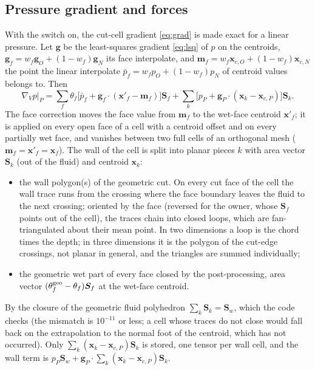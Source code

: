 \documentclass[11pt,a4paper]{article}
\theoremstyle{remark}
\newcommand{\xx}{\bm{x}}
\newcommand{\Sf}{\bm{S}_f}
\newcommand{\Sw}{\bm{S}_w}
\newcommand{\gradV}{\nabla_{\!V}}
\begin{document}
\subsection{Pressure gradient and forces}
\label{sec:grad2}

With the switch on, the cut-cell gradient \eqref{eq:grad} is made exact for a linear pressure.
Let $\bm g$ be the least-squares gradient \eqref{eq:lsq} of $p$ on the centroids, $\bm g_f=
w_f\bm g_O+(1-w_f)\bm g_N$ its face interpolate, and
$\bm m_f=w_f\xx_{c,O}+(1-w_f)\xx_{c,N}$ the point the linear interpolate
$\bar p_f=w_fp_O+(1-w_f)p_N$ of centroid values belongs to. Then
\begin{equation}
\gradV p\big|_P=\sum_f\theta_f\Big[\bar p_f+\bm g_f\cdot(\xx'_f-\bm m_f)\Big]\Sf
+\sum_k\Big[p_P+\bm g_P\cdot(\xx_k-\xx_{c,P})\Big]\bm S_k .
\label{eq:grad2}
\end{equation}
The face correction moves the face value from $\bm m_f$ to the wet-face centroid $\xx'_f$; it is
applied on every open face of a cell with a centroid offset and on every partially wet face, and
vanishes between two full cells of an orthogonal mesh ($\bm m_f=\xx'_f=\xx_f$). The wall of the cell
is split into planar pieces $k$ with area vector $\bm S_k$ (out of the fluid) and centroid
$\xx_k$:
\begin{itemize}\itemsep1pt
\item the wall polygon(s) of the geometric cut. On every cut face of the cell the wall trace runs
      from the crossing where the face boundary leaves the fluid to the next crossing; oriented
      by the face (reversed for the owner, whose $\Sf$ points out of the cell), the traces chain
      into closed loops, which are fan-triangulated about their mean point. In two dimensions a
      loop is the chord times the depth; in three dimensions it is the polygon of the cut-edge
      crossings, not planar in general, and the triangles are summed individually;
\item the geometric wet part of every face closed by the post-processing, area vector
      $(\theta^{\rm geo}_f-\theta_f)\Sf$ at the wet-face centroid.
\end{itemize}
By the closure of the geometric fluid polyhedron $\sum_k\bm S_k=\Sw$, which the code checks
(the mismatch is $10^{-11}$ or less; a cell whose traces do not close would fall back on the
extrapolation to the normal foot of the centroid, which has not occurred). Only
$\sum_k(\xx_k-\xx_{c,P})\bm S_k$ is stored, one tensor per wall cell, and the wall term is
$p_P\Sw+\bm g_P\cdot\sum_k(\xx_k-\xx_{c,P})\bm S_k$.
\end{document}
